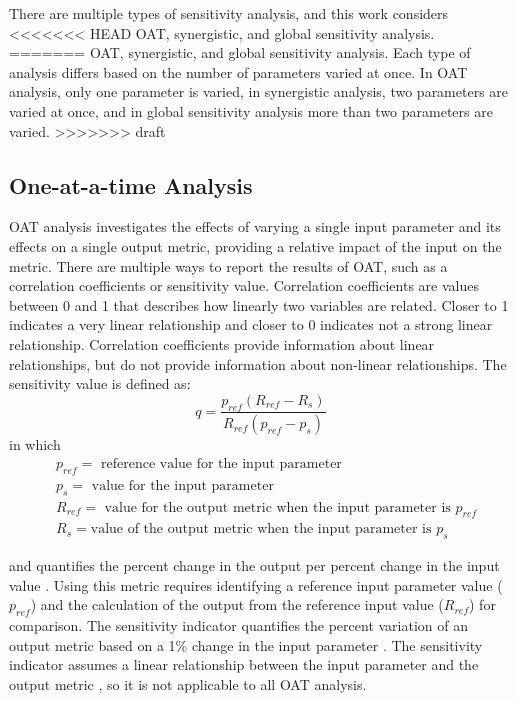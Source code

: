 There are multiple types of sensitivity analysis, and this work considers 
<<<<<<< HEAD
\gls{OAT}, synergistic, and global sensitivity analysis. 
=======
\gls{OAT}, synergistic, and global sensitivity analysis. Each type of 
analysis differs based on the number of parameters varied at once. 
In \gls{OAT} analysis, only one parameter is varied, in synergistic 
analysis, two parameters are varied at once, and in global 
sensitivity analysis more than two parameters are varied. 
>>>>>>> draft

\subsection{One-at-a-time Analysis}\label{sec:oat_background}
\gls{OAT} analysis 
investigates the effects of varying a single input parameter and its effects
on a single output metric, providing a relative impact of the input on the 
metric. There are multiple ways to report the results of \gls{OAT}, such as a 
correlation coefficients or sensitivity value. Correlation coefficients 
are values between 0 and 1 that describes how linearly two variables 
are related. Closer to 1 indicates a very linear relationship and closer to 
0 indicates not a strong linear relationship. Correlation coefficients 
provide information about linear relationships, but do not provide 
information about non-linear relationships. 
The sensitivity value is defined as:
\begin{equation}
    q = \frac{p_{ref}(R_{ref}-R_s)}{R_{ref}(p_{ref}-p_s)}
    \label{eq:sensitivity_metric}
\end{equation}
in which 
\begin{align*}
    &p_{ref} = \text{ reference value for the input parameter}\\
    &p_s = \text{ value for the input parameter}\\
    &R_{ref} = \text{ value for the output metric when the input parameter is }p_{ref}\\
    &R_s = \text{value of the output metric when the input parameter is }p_s
\end{align*}

\noindent and quantifies the percent change in the output 
per percent change in the input value \cite{noauthor_effects_2017}. 
Using this metric requires identifying a reference input parameter value 
($p_{ref}$) and the calculation of the output from the reference input value 
($R_{ref}$) for comparison. The sensitivity indicator  
quantifies the percent variation of an output metric based on a 1\% change in 
the input parameter \cite{noauthor_effects_2017}. The sensitivity indicator 
assumes a linear relationship between the input parameter and the output metric 
\cite{noauthor_effects_2017}, so it is not applicable to all \gls{OAT} 
analysis. 

